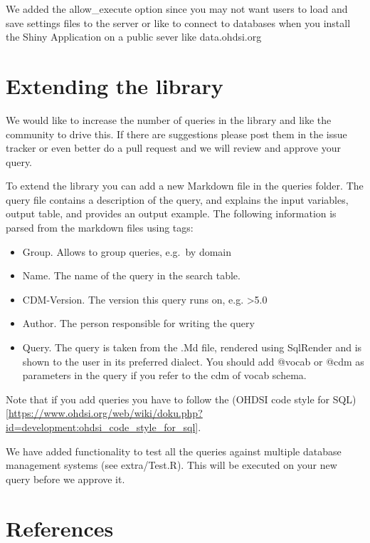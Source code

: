 \documentclass[]{article}
\providecommand{\tightlist}{%
  \setlength{\itemsep}{0pt}\setlength{\parskip}{0pt}}
\begin{document}
We added the allow\_execute option since you may not want users to load
and save settings files to the server or like to connect to databases
when you install the Shiny Application on a public sever like
data.ohdsi.org

\hypertarget{extending-the-library}{%
\section{Extending the library}\label{extending-the-library}}

We would like to increase the number of queries in the library and like
the community to drive this. If there are suggestions please post them
in the issue tracker or even better do a pull request and we will review
and approve your query.

To extend the library you can add a new Markdown file in the queries
folder. The query file contains a description of the query, and explains
the input variables, output table, and provides an output example. The
following information is parsed from the markdown files using tags:

\begin{itemize}
\tightlist
\item
  Group. Allows to group queries, e.g.~by domain
\item
  Name. The name of the query in the search table.
\item
  CDM-Version. The version this query runs on, e.g. \textgreater{}5.0
\item
  Author. The person responsible for writing the query
\item
  Query. The query is taken from the .Md file, rendered using SqlRender
  and is shown to the user in its preferred dialect. You should add
  @vocab or @cdm as parameters in the query if you refer to the cdm of
  vocab schema.
\end{itemize}

Note that if you add queries you have to follow the (OHDSI code style
for
SQL){[}\url{https://www.ohdsi.org/web/wiki/doku.php?id=development:ohdsi_code_style_for_sql}{]}.

We have added functionality to test all the queries against multiple
database management systems (see extra/Test.R). This will be executed on
your new query before we approve it.

\hypertarget{references}{%
\section{References}\label{references}}
\end{document}
